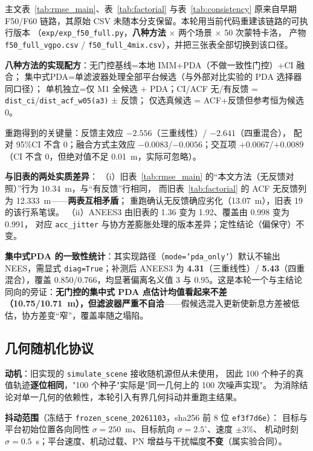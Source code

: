 \documentclass[UTF8,a4paper,zihao=-4]{ctexart}
\begin{document}
主文表~\ref{tab:rmse_main}、表~\ref{tab:factorial} 与表~\ref{tab:consistency} 原来自早期
F50/F60 链路，其原始 CSV 未随本分支保留。本轮用当前代码重建该链路的可执行版本
（\texttt{exp/exp\_f50\_full.py}，\textbf{八种方法} $\times$ 两个场景 $\times$ 50 次蒙特卡洛，
产物 \texttt{f50\_full\_vgpo.csv} / \texttt{f50\_full\_4mix.csv}），并把三张表全部切换到该口径。

\textbf{八种方法的实现配方}：无门控基线=本地 IMM+PDA（不做一致性门控）+CI 融合；
集中式PDA=单滤波器处理全部平台候选（与外部对比实验的 PDA 选择器同口径）；
单机独立=仅 M1 全候选 + PDA；CI/ACF 无/有反馈 = \texttt{dist\_ci}/\texttt{dist\_acf\_w05(a3)} ± 反馈；
仅选真候选 = ACF+反馈但参考恒为候选 0。

重跑得到的关键量：反馈主效应 $-2.556$（三重线性）/ $-2.641$（四重混合），
配对 95\%CI 不含 0；融合方式主效应 $-0.0083$/$-0.0056$；交互项 $+0.0067$/$+0.0089$
（CI 不含 0，但绝对值不足 0.01~m，实际可忽略）。

\textbf{与旧表的两处实质差异}：
（i）旧表~\ref{tab:rmse_main} 的“本文方法（无反馈对照）”行为 10.34~m，与“有反馈”行相同，
而旧表~\ref{tab:factorial} 的 ACF 无反馈列为 12.333~m——\textbf{两表互相矛盾}；
重跑确认无反馈确应劣化（13.07~m），旧表 19 的该行系笔误。
（ii）ANEES3 由旧表的 1.36 变为 1.92、覆盖由 0.998 变为 0.991，
对应 \texttt{acc\_jitter} 与协方差膨胀处理的版本差异；定性结论（偏保守）不变。

\textbf{集中式PDA 的一致性统计}：其实现路径（\texttt{mode='pda\_only'}）默认不输出 NEES，需显式 \texttt{diag=True}；补测后 ANEES3 为 \textbf{4.31}（三重线性）/ \textbf{5.43}（四重混合），覆盖 0.850/0.766，均显著偏离名义值 3 与 0.95。这是本轮一个与主结论同向的旁证：\textbf{无门控的集中式 PDA 点估计均值看起来不差（10.75/10.71~m），但滤波器严重不自洽}——假候选混入更新使新息方差被低估，协方差变“窄”，覆盖率随之塌陷。
\subsection{几何随机化协议}\label{sup:geom-protocol}

\textbf{动机}：旧实现的 \texttt{simulate\_scene} 接收随机源但从未使用，
因此 100 个种子的真值轨迹\textbf{逐位相同}，"100 个种子"实际是"同一几何上的 100 次噪声实现"。
为消除结论对单一几何的依赖性，本轮引入有界几何抖动并重跑主结果。

\textbf{抖动范围}（冻结于 \texttt{frozen\_scene\_20261103}，sha256 前 8 位 \texttt{ef3f7d6e}）：
目标与平台初始位置各向同性 \(\sigma=250\)~m、目标航向 \(\sigma=2.5^\circ\)、速度 \(\pm3\%\)、
机动时刻 \(\sigma=0.5\)~s；平台速度、机动过载、PN 增益与干扰幅度\textbf{不变}（属实验合同）。
\end{document}
